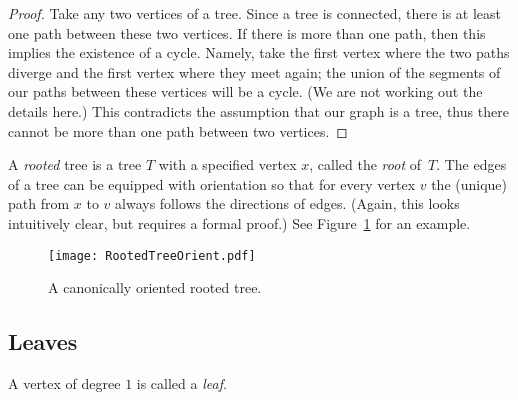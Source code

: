 \begin{page}
\setcounter{section}{2}
\setcounter{subsection}{2}
\setcounter{dfn}{2}
\label{portion:251}

\begin{proof}
Take any two vertices of a tree.
Since a tree is connected, there is at least one path between these two vertices.
If there is more than one path, then this implies the existence of a cycle.
Namely, take the first vertex where the two paths diverge and the first vertex where they meet again;
the union of the segments of our paths between these vertices will be a cycle.
(We are not working out the details here.)
This contradicts the assumption that our graph is a tree, thus there cannot be more than one path between two vertices.
\end{proof}

A \emph{rooted} tree is a tree $T$ with a specified vertex $x$, called the \emph{root} of~$T$.
The edges of a tree can be equipped with orientation so that for every vertex $v$ the (unique) path from $x$ to $v$ always follows the directions of edges.
(Again, this looks intuitively clear, but requires a formal proof.)
See Figure~\ref{fig:RootedTreeOrient} for an example.

\begin{figure}[ht]
\begin{center}
\texttt{[image: RootedTreeOrient.pdf]}
\end{center}
\caption{A canonically oriented rooted tree.}
\label{fig:RootedTreeOrient}
\end{figure}



\end{page}

\begin{page}
\setcounter{section}{2}
\setcounter{subsection}{2}
\setcounter{dfn}{2}
\label{portion:253}

\subsection{Leaves}

\end{page}

\begin{page}
\setcounter{section}{2}
\setcounter{subsection}{2}
\setcounter{dfn}{3}
\label{portion:255}

\begin{dfn}
A vertex of degree $1$ is called a \emph{leaf}.
\end{dfn}

\end{page}

